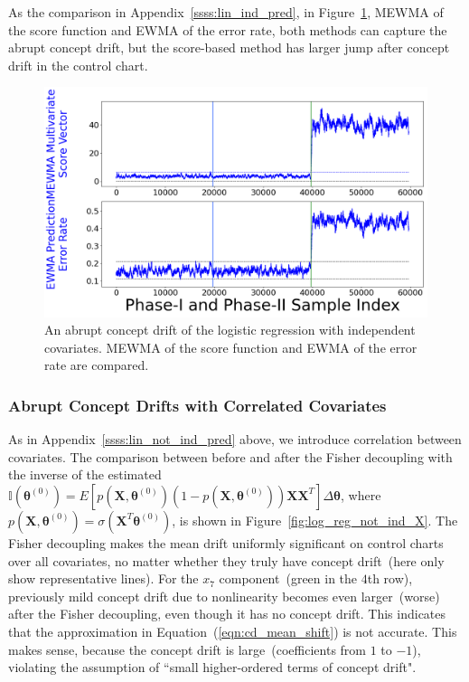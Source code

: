 \documentclass[twoside,11pt]{article}
\begin{document}
\begin{appendices}
As the comparison in Appendix~\ref{ssss:lin_ind_pred}, in Figure~\ref{fig:log_reg_ind_X_comp}, MEWMA of the score function and EWMA of the error rate, both methods can capture the abrupt concept drift, but the score-based method has larger jump after concept drift in the control chart.

\begin{figure}[!htbp]
\centering
\includegraphics[width = 0.8\linewidth]{../figures/v14/sim_5/logi_no_muco/1_sim5_logi_1e-08_0_005_1.png}
  \caption{An abrupt concept drift of the logistic regression with independent covariates. MEWMA of the score function and EWMA of the error rate are compared.}
  \label{fig:log_reg_ind_X_comp}
\end{figure}

\subsubsection{Abrupt Concept Drifts with Correlated Covariates}
\label{ssss:log_not_ind_pred}
As in Appendix~\ref{ssss:lin_not_ind_pred} above, we introduce correlation between covariates. The comparison between before and after the Fisher decoupling with {the inverse of the estimated} {$\mathbb {I} ( {\bm{\theta}} ^{ (0)}) = E [{p} (\bm {X},\bm { \theta} ^{ (0)}) (1-{p}(\bm {X},\bm { \theta} ^{ (0)})) \bm {X} \bm {X}^T] \Delta \bm{ \theta}$}, where {$p (\bm {X},\bm { \theta} ^{ (0)}) = \sigma ( \bm {X}^T\bm { \theta} ^{ (0)})$}, is shown in Figure~\ref{fig:log_reg_not_ind_X}. The Fisher decoupling makes the mean {drift} uniformly significant on control charts over all covariates, no matter whether they truly have concept drift~(here only show representative lines). For the $x_7$ component~(green in the $4$th row), previously mild concept drift due to nonlinearity becomes even larger~(worse) after the Fisher decoupling, even though it has no concept drift. This indicates that the approximation in Equation~(\ref{eqn:cd_mean_shift}) is not accurate. This makes sense, because the concept drift is large~(coefficients from $1$ to $-1$), violating the assumption of ``small higher-ordered terms of concept drift".


\end{appendices}
\end{document}
